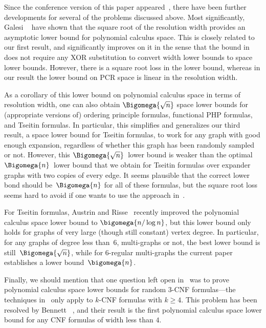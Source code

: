 \documentclass{toc}
\begin{document}

Since the conference version of this paper 
appeared~\cite{conf-version}, %
there have been further developments for several of the problems
discussed above. 
%
Most significantly,
Galesi \etal~\cite{GKT19SpaceWidth} have shown that
the square root of the resolution width provides an asymptotic lower
bound for polynomial calculus space.
This is closely related to our first result, and significantly
improves on it in the sense that the bound in~\cite{GKT19SpaceWidth}
does not require any XOR substitution to convert width lower bounds to
space lower bounds. However, there is a square root loss in the lower
bound, whereas in our result the lower bound on PCR space is linear in
the resolution width.

As a corollary of this lower bound on polynomial calculus space in
terms of resolution width, one can also obtain
$\Bigomega{\sqrt{n}}$
space lower bounds for (appropriate versions of)
ordering principle formulas, 
functional PHP formulas, 
and
Tseitin formulas.
%
In particular, this simplifies and generalizes our third result, a
space lower bound for Tseitin formulas, to work for any graph with
good enough expansion, regardless of whether this graph has been
randomly sampled or not.
%
However, this
$\Bigomega{\sqrt{n}}$~lower bound is weaker than the optimal 
$\Bigomega{n}$~lower bound that we obtain for Tseitin formulas over
expander graphs with two copies of every edge. It seems plausible that 
the correct lower bond should be~$\Bigomega{n}$
for all of these formulas, but the square root loss seems hard to
avoid if one wants to use the approach in~\cite{GKT19SpaceWidth}.

For Tseitin formulas, Austrin and Risse~\cite{AR22PerfectMatching}
recently improved the polynomial calculus space lower bound to
$\bigomega{n/\log n}$,
but this lower bound only holds for graphs of very large (though
still constant) vertex degree. In particular, for any graphs of degree less
than~$6$, multi-graphs or not, the best lower bound is 
still~$\Bigomega{\sqrt{n}}$,
while for $6$-regular multi-graphs the current paper establishes  a
lower bound~$\bigomega{n}$.

Finally, we should mention that one question left open
in~\cite{BG15Framework} was to prove polynomial calculus space lower
bounds for random \mbox{$3$-CNF} formulas---the techniques 
in~\cite{BG15Framework} only apply %
to  %
\mbox{$k$-CNF} formulas with 
$k \geq 4$. This problem has been resolved by
Bennett \etal~\cite{BBGHMW17SpaceProofCplx},
and their result is the first polynomial calculus space lower bound for
any CNF formulas of width less than $4$.
\end{document}
